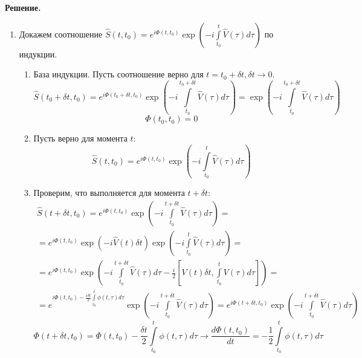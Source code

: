 \documentclass[12pt]{article}
\theoremstyle{definition}
\begin{document}
\textbf{Решение.}
\begin{enumerate}
    \item Докажем соотношение $\hat{S}(t,t_0) = e^{i\Phi(t,t_0)}\exp\left(-i\int\limits_{t_0}^t\hat{V}(\tau)d\tau\right)$ по индукции.
    \begin{enumerate}
        \item База индукции. Пусть соотношение верно для $t=t_0+\delta t,\delta t\rightarrow0$.
        \begin{equation}
            \hat{S}(t_0+\delta t,t_0) = e^{i\Phi(t_0+\delta t,t_0)}\exp\left(-i\int\limits_{t_0}^{t_0+\delta t}\hat{V}(\tau)d\tau\right)=\exp\left(-i\int\limits_{t_0}^{t_0+\delta t}\hat{V}(\tau)d\tau\right)
        \end{equation}
        \begin{equation}
            \boxed{\Phi(t_0,t_0)=0}
        \end{equation}
        \item Пусть верно для момента $t$:
        \begin{equation}
            \hat{S}(t,t_0) = e^{i\Phi(t,t_0)}\exp\left(-i\int\limits_{t_0}^t\hat{V}(\tau)d\tau\right)
        \end{equation}
        \item Проверим, что выполняется для момента $t+\delta t$:
        \begin{multline}
            \hat{S}(t+\delta t,t_0) = e^{i\Phi(t,t_0)}\exp\left(-i\int\limits_{t_0}^{t+\delta t}\hat{V}(\tau)d\tau\right)=\\=e^{i\Phi(t,t_0)}\exp\left(-i\hat{V}(t)\delta t\right)\exp\left(-i\int\limits_{t_0}^t\hat{V}(\tau)d\tau\right)=\\=e^{i\Phi(t,t_0)}\exp\left(-i\int\limits_{t_0}^{t+\delta t}\hat{V}(\tau)d\tau-\frac{i}{2}\left[V(t)\delta t,\int\limits_{t_0}^tV(\tau)d\tau\right]\right)=\\=e^{i\Phi(t,t_0)-\frac{i\delta t}{2}\int\limits_{t_0}^t\phi(t,\tau)d\tau}\exp\left(-i\int\limits_{t_0}^{t+\delta t}\hat{V}(\tau)d\tau\right)=e^{i\Phi(t+\delta t,t_0)}\exp\left(-i\int\limits_{t_0}^{t+\delta t}\hat{V}(\tau)d\tau\right)
        \end{multline}
        \begin{equation}
            \Phi(t+\delta t,t_0)=\Phi(t,t_0)-\frac{\delta t}{2}\int\limits_{t_0}^t\phi(t,\tau)d\tau\rightarrow\frac{d\Phi(t,t_0)}{dt}=-\frac{1}{2}\int\limits_{t_0}^t\phi(t,\tau)d\tau
        \end{equation}
        \begin{equation}

\end{equation}
\end{enumerate}
\end{enumerate}
\end{document}
